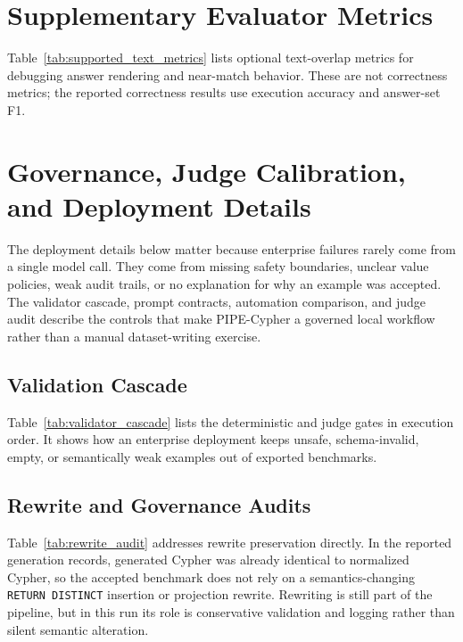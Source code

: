 \documentclass[11pt]{article}
\begin{document}
\FloatBarrier

\section{Supplementary Evaluator Metrics}

Table~\ref{tab:supported_text_metrics} lists optional text-overlap metrics for debugging answer rendering and near-match behavior. These are not correctness metrics; the reported correctness results use execution accuracy and answer-set F1.



\FloatBarrier

\section{Governance, Judge Calibration, and Deployment Details}

The deployment details below matter because enterprise failures rarely come from a single model call. They come from missing safety boundaries, unclear value policies, weak audit trails, or no explanation for why an example was accepted. The validator cascade, prompt contracts, automation comparison, and judge audit describe the controls that make PIPE-Cypher a governed local workflow rather than a manual dataset-writing exercise.

\subsection{Validation Cascade}

Table~\ref{tab:validator_cascade} lists the deterministic and judge gates in execution order. It shows how an enterprise deployment keeps unsafe, schema-invalid, empty, or semantically weak examples out of exported benchmarks.



\subsection{Rewrite and Governance Audits}

Table~\ref{tab:rewrite_audit} addresses rewrite preservation directly. In the reported generation records, generated Cypher was already identical to normalized Cypher, so the accepted benchmark does not rely on a semantics-changing \texttt{RETURN DISTINCT} insertion or projection rewrite. Rewriting is still part of the pipeline, but in this run its role is conservative validation and logging rather than silent semantic alteration.
\end{document}
